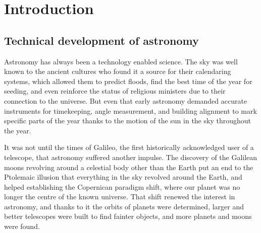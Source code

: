 \chapter{Introduction}
\label{introduction}

\section{Technical development of astronomy} %
\label{sec:astronomy_technical_developments}
	
	Astronomy has always been a technology enabled science. The sky
	was well known to the ancient cultures who found it a source for
	their calendaring systems, which allowed them to predict floods,
	find the best time of the year for seeding, and even reinforce
	the status of religious ministers due to their connection to the
	universe. But even that early astronomy demanded accurate
	instruments for timekeeping, angle measurement, and building
	alignment to mark specific parts of the year thanks to the
	motion of the sun in the sky throughout the year.
	
	 It was not until the times of Galileo, the first historically
	acknowledged user of a telescope, that astronomy suffered
	another impulse. The discovery of the Galilean moons revolving
	around a celestial body other than the Earth put an end to the
	Ptolemaic illusion that everything in the sky revolved around
	the Earth, and helped establishing the Copernican paradigm
	shift, where our planet was no longer the centre of the known
	universe. That shift renewed the interest in astronomy, and
	thanks to it the orbits of planets were determined, larger and
	better telescopes were built to find fainter objects, and more
	planets and moons were found.
	

